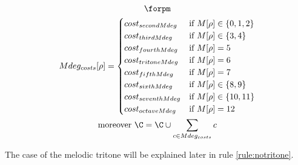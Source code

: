 \begin{equation}\label{eq:mdeg_costs}
    \begin{gathered}
        \forpm\\
        Mdeg_{costs}[\rho] = \begin{cases}
            cost_{secondMdeg} & \text{if } M[\rho] \in \{0, 1, 2\}\\
            cost_{thirdMdeg} & \text{if } M[\rho] \in \{3, 4\}\\
            cost_{fourthMdeg} & \text{if } M[\rho] = 5\\
            cost_{tritoneMdeg} & \text{if } M[\rho] = 6\\
            cost_{fifthMdeg} & \text{if } M[\rho] = 7\\
            cost_{sixthMdeg} & \text{if } M[\rho] \in \{8, 9\}\\
            cost_{seventhMdeg} & \text{if } M[\rho] \in \{10, 11\}\\
            cost_{octaveMdeg} & \text{if } M[\rho] = 12\\
        \end{cases}\\
        \text{moreover } \C = \C \cup \sum _{c \in Mdeg_{costs}} c
    \end{gathered}
\end{equation}

The case of the melodic tritone will be explained later in rule \ref{rule:notritone}.


